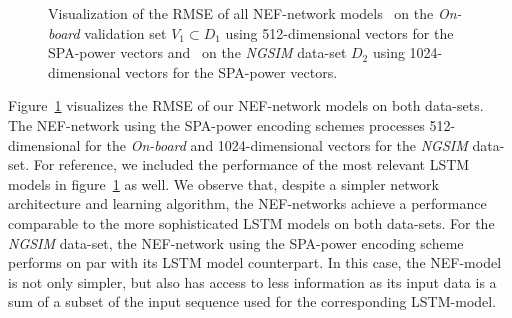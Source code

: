 \begin{figure}[t!]
	\centering
    \vspace{-0.3cm}
    \caption{Visualization of the \ac{RMSE} of all \ac{NEF}-network models~\protect{} on the \emph{On-board} validation set $V_1 \subset D_1$ using \num{512}-dimensional vectors for the \ac{SPA}-power vectors and~\protect{} on the \emph{\ac{NGSIM}} data-set $D_2$ using \num{1024}-dimensional vectors for the \ac{SPA}-power vectors.}\label{fig:rmse_nef_nets}

\end{figure}

Figure~\ref{fig:rmse_nef_nets} visualizes the \ac{RMSE} of our \ac{NEF}-network models on both data-sets.
The \ac{NEF}-network using the \ac{SPA}-power encoding schemes processes \num{512}-dimensional  for the \emph{On-board} and \num{1024}-dimensional vectors for the \emph{\ac{NGSIM}} data-set.
For reference, we included the performance of the most relevant \ac{LSTM} models in figure~\ref{fig:rmse_nef_nets} as well.
We observe that, despite a simpler network architecture and learning algorithm, the \ac{NEF}-networks achieve a performance comparable to the more sophisticated \ac{LSTM} models on both data-sets.
For the \emph{\ac{NGSIM}} data-set, the \ac{NEF}-network using the \ac{SPA}-power encoding scheme performs on par with its \ac{LSTM} model counterpart.
In this case, the \ac{NEF}-model is not only simpler, but also has access to less information as its input data is a sum of a subset of the input sequence used for the corresponding \ac{LSTM}-model.


